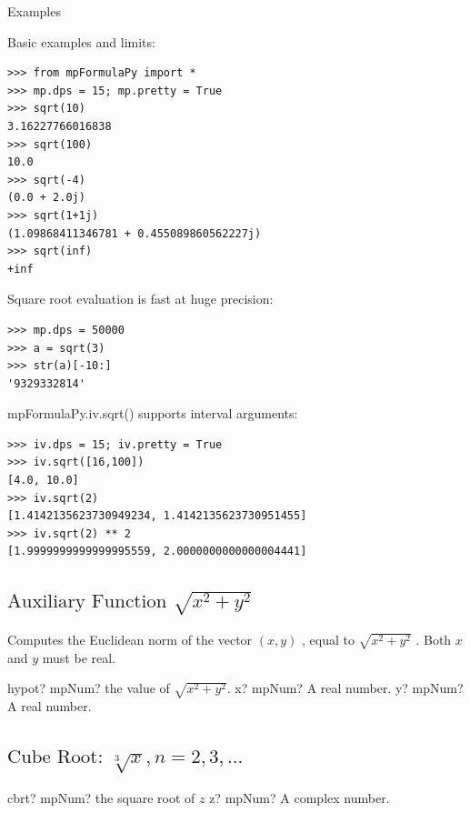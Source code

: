 Examples

Basic examples and limits:
\begin{lstlisting}
>>> from mpFormulaPy import *
>>> mp.dps = 15; mp.pretty = True
>>> sqrt(10)
3.16227766016838
>>> sqrt(100)
10.0
>>> sqrt(-4)
(0.0 + 2.0j)
>>> sqrt(1+1j)
(1.09868411346781 + 0.455089860562227j)
>>> sqrt(inf)
+inf
\end{lstlisting}


Square root evaluation is fast at huge precision:
\begin{lstlisting}
>>> mp.dps = 50000
>>> a = sqrt(3)
>>> str(a)[-10:]
'9329332814'
\end{lstlisting}


mpFormulaPy.iv.sqrt() supports interval arguments:
\begin{lstlisting}
>>> iv.dps = 15; iv.pretty = True
>>> iv.sqrt([16,100])
[4.0, 10.0]
>>> iv.sqrt(2)
[1.4142135623730949234, 1.4142135623730951455]
>>> iv.sqrt(2) ** 2
[1.9999999999999995559, 2.0000000000000004441]
\end{lstlisting}



\subsection{\texorpdfstring{$\text{Auxiliary Function }\sqrt{x^2+y^2}$}{Hypot}}
Computes the Euclidean norm of the vector $(x, y)$ , equal to $\sqrt{x^2+y^2}$ . Both $x$ and $y$ must be real.



\begin{mpFunctionsExtract}
	\mpFunctionTwo
	{hypot? mpNum? the value of $\sqrt{x^2+y^2}$.}
	{x? mpNum? A real number.}
	{y? mpNum? A real number.}
\end{mpFunctionsExtract}





\subsection{\texorpdfstring{$\text{Cube Root: }\sqrt[3]{x}, n=2,3,...$}{CubeRoot}}

\begin{mpFunctionsExtract}
	\mpFunctionOne
	{cbrt? mpNum? the square root of $z$}
	{z? mpNum? A complex number.}
\end{mpFunctionsExtract}


